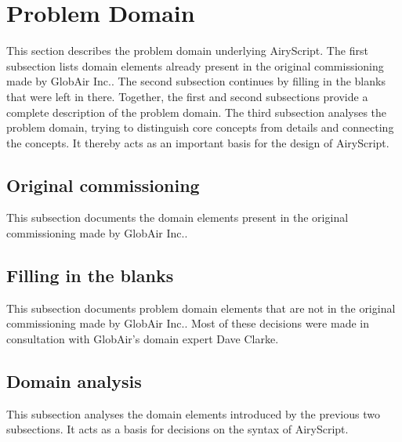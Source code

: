 \section{Problem Domain}
This section describes the problem domain underlying AiryScript. The first
subsection lists domain elements already present in the original commissioning
made by GlobAir Inc.. The second subsection continues by filling in the blanks
that were left in there. Together, the first and second subsections provide a
complete description of the problem domain. The third subsection analyses the
problem domain, trying to distinguish core concepts from details and connecting
the concepts. It thereby acts as an important basis for the design of
AiryScript.

\subsection{Original commissioning}
This subsection documents the domain elements present in the original
commissioning made by GlobAir Inc..


\subsection{Filling in the blanks}
This subsection documents problem domain elements that are not in the original
commissioning made by GlobAir Inc.. Most of these decisions were made in
consultation with GlobAir’s domain expert Dave Clarke.

\subsection{Domain analysis}
This subsection analyses the domain elements introduced by the previous two
subsections. It acts as a basis for decisions on the syntax of AiryScript.

